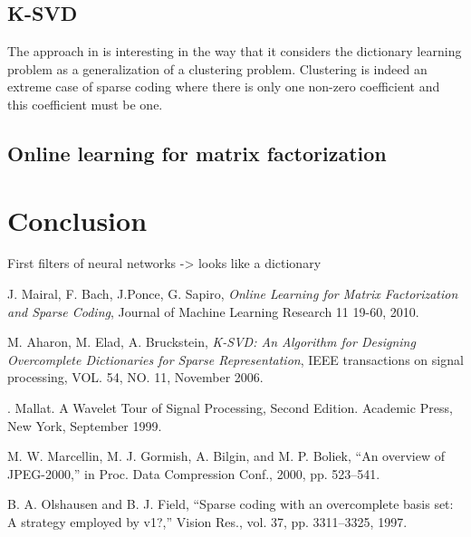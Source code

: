 \documentclass[a4paper,11pt]{article}
\begin{document}
\subsection{K-SVD}
The approach in \cite{aharon06} is interesting in the way that it considers the dictionary learning problem as a generalization of a clustering problem. Clustering is indeed an extreme case of sparse coding where there is only one non-zero coefficient and this coefficient must be one.

\subsection{Online learning for matrix factorization}
\cite{mairal10}

\section{Conclusion}
First filters of neural networks -> looks like a dictionary



\begin{thebibliography}{9}
  J. Mairal, F. Bach, J.Ponce, G. Sapiro,
  \emph{Online Learning for Matrix Factorization and Sparse Coding},
  Journal of Machine Learning Research 11 19-60, 2010.

  M. Aharon, M. Elad, A. Bruckstein,
  \emph{K-SVD: An Algorithm for Designing Overcomplete Dictionaries for Sparse Representation},
  IEEE transactions on signal processing, VOL. 54, NO. 11, November 2006.

. Mallat. A Wavelet Tour of Signal Processing, Second Edition. Academic Press, New York,
September 1999.


M. W. Marcellin, M. J. Gormish, A. Bilgin, and M. P. Boliek, “An
overview of JPEG-2000,” in Proc. Data Compression Conf., 2000, pp.
523–541.

B. A. Olshausen and B. J. Field, “Sparse coding with an overcomplete
basis set: A strategy employed by v1?,” Vision Res., vol. 37, pp.
3311–3325, 1997.



\end{thebibliography}
\end{document}
